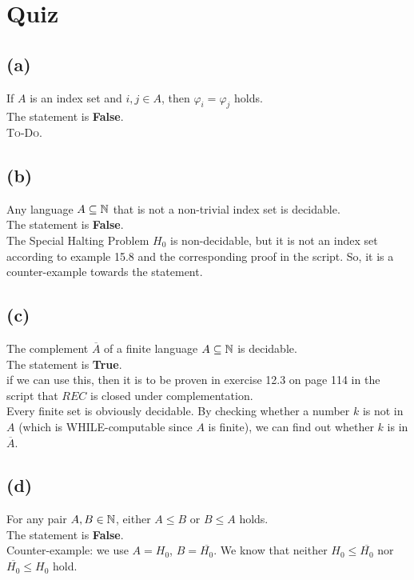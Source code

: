 



\section{Quiz}

\subsection{(a)}
If $A$ is an index set and $i,j\in A$, then $\varphi_{i}=\varphi_{j}$ holds.\\
The statement is \textbf{False}.\\
\textsc{To-Do.}

\subsection{(b)}
Any language $A\subseteq\mathbb{N}$ that is not a non-trivial index set is decidable.\\
The statement is \textbf{False}.\\
The Special Halting Problem $H_{0}$ is non-decidable, but it is not an index set according to example 15.8 and the corresponding proof in the script. So, it is a counter-example towards the statement.

\subsection{(c)}
The complement $\overline{A}$ of a finite language $A\subseteq\mathbb{N}$ is decidable.\\
The statement is \textbf{True}.\\
{\color{red} if we can use this, then it is to be proven in exercise 12.3 on page 114 in the script that $REC$ is closed under complementation.}\\
Every finite set is obviously decidable. By checking whether a number $k$ is not in $A$ (which is \textsc{WHILE}-computable since $A$ is finite), we can find out whether $k$ is in $\overline{A}$.

\subsection{(d)}
For any pair $A,B\in\mathbb{N}$, either $A\leq B$ or $B\leq A$ holds.\\
The statement is \textbf{False}.\\
Counter-example: we use $A=H_{0}$, $B=\overline{H_{0}}$. We know that neither $H_{0}\leq\overline{H_{0}}$ nor $\overline{H_{0}}\leq H_{0}$ hold.

